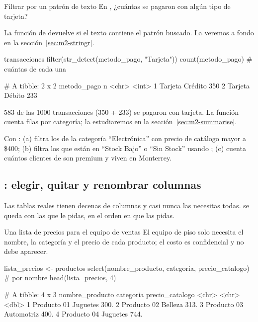\begin{ejemplo}{Filtrar por un patrón de texto}
En , ¿cuántas se pagaron con algún tipo de tarjeta?
\end{ejemplo}

La función  de  devuelve
 si el texto contiene el patrón buscado. La veremos a fondo en
la sección~\ref{sec:m2-stringr}.

\begin{rcode}
transacciones %
  filter(str_detect(metodo_pago, "Tarjeta")) %
  count(metodo_pago)                              # cuántas de cada una
\end{rcode}
\begin{rsalida}
# A tibble: 2 x 2
  metodo_pago         n
  <chr>           <int>
1 Tarjeta Crédito   350
2 Tarjeta Débito    233
\end{rsalida}

583 de las 1000 transacciones (350 + 233) se pagaron con tarjeta.
La función  cuenta filas por categoría; la estudiaremos en
la sección~\ref{sec:m2-summarise}.

\begin{hazlotu}
Con : (a) filtra los de la categoría ``Electrónica'' con
precio de catálogo mayor a \$400; (b) filtra los que están en
``Stock Bajo'' o ``Sin Stock'' usando ; (c) cuenta cuántos
clientes de  son premium y viven en Monterrey.
\end{hazlotu}

\subsection{\texorpdfstring{}{select()}: elegir, quitar y renombrar columnas}
\label{sec:m2-select}

Las tablas reales tienen decenas de columnas y casi nunca las necesitas
todas.  se queda con las que le pidas, en el orden en que
las pidas.

\begin{ejemplo}{Una lista de precios para el equipo de ventas}
El equipo de piso solo necesita el nombre, la categoría y el precio de cada
producto; el costo es confidencial y no debe aparecer.
\end{ejemplo}

\begin{rcode}
lista_precios <- productos %
  select(nombre_producto, categoria, precio_catalogo)   # por nombre
head(lista_precios, 4)
\end{rcode}
\begin{rsalida}
# A tibble: 4 x 3
  nombre_producto categoria  precio_catalogo
  <chr>           <chr>                <dbl>
1 Producto 01     Juguetes              300.
2 Producto 02     Belleza               313.
3 Producto 03     Automotriz            400.
4 Producto 04     Juguetes              744.
\end{rsalida}

